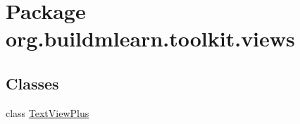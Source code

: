 \hypertarget{namespaceorg_1_1buildmlearn_1_1toolkit_1_1views}{}\section{Package org.\+buildmlearn.\+toolkit.\+views}
\label{namespaceorg_1_1buildmlearn_1_1toolkit_1_1views}
\subsection*{Classes}
\begin{DoxyCompactItemize}
\item 
class \hyperlink{classorg_1_1buildmlearn_1_1toolkit_1_1views_1_1TextViewPlus}{Text\+View\+Plus}
\end{DoxyCompactItemize}

